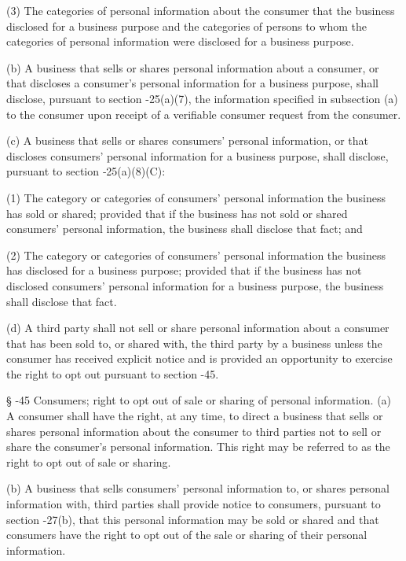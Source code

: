      (3)  The categories of personal information about the consumer that the business disclosed for a business purpose and the categories of persons to whom the categories of personal information were disclosed for a business purpose.

     (b)  A business that sells or shares personal information about a consumer, or that discloses a consumer's personal information for a business purpose, shall disclose, pursuant to section    -25(a)(7), the information specified in subsection (a) to the consumer upon receipt of a verifiable consumer request from the consumer.

     (c)  A business that sells or shares consumers' personal information, or that discloses consumers' personal information for a business purpose, shall disclose, pursuant to section    ‑25(a)(8)(C):

     (1)  The category or categories of consumers' personal information the business has sold or shared; provided that if the business has not sold or shared consumers' personal information, the business shall disclose that fact; and

     (2)  The category or categories of consumers' personal information the business has disclosed for a business purpose; provided that if the business has not disclosed consumers' personal information for a business purpose, the business shall disclose that fact.

     (d)  A third party shall not sell or share personal information about a consumer that has been sold to, or shared with, the third party by a business unless the consumer has received explicit notice and is provided an opportunity to exercise the right to opt out pursuant to section    -45.

     §   -45  Consumers; right to opt out of sale or sharing of personal information.  (a)  A consumer shall have the right, at any time, to direct a business that sells or shares personal information about the consumer to third parties not to sell or share the consumer's personal information.  This right may be referred to as the right to opt out of sale or sharing.

     (b)  A business that sells consumers' personal information to, or shares personal information with, third parties shall provide notice to consumers, pursuant to section    -27(b), that this personal information may be sold or shared and that consumers have the right to opt out of the sale or sharing of their personal information.

